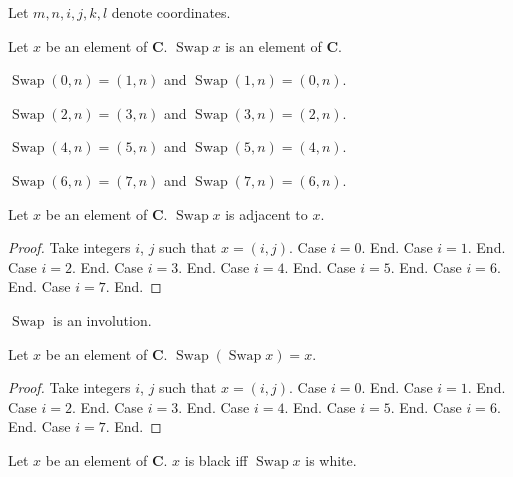 \documentclass[english]{article}
\newcommand{\Checkerboard}{\mathbf{C}}
\newcommand{\Swap}[1]{\operatorname{Swap}#1}
\begin{document}
\begin{forthel}
    Let $m, n, i, j, k, l$ denote coordinates.

    \begin{signature}
        Let $x$ be an element of $\Checkerboard$.
        $\Swap{x}$ is an element of $\Checkerboard$.
    \end{signature}

    \begin{axiom} $\Swap{(0, n)} = (1, n)$ and $\Swap{(1, n)} = (0, n)$. \end{axiom}

    \begin{axiom} $\Swap{(2, n)} = (3, n)$ and $\Swap{(3, n)} = (2, n)$. \end{axiom}

    \begin{axiom} $\Swap{(4, n)} = (5, n)$ and $\Swap{(5, n)} = (4, n)$. \end{axiom}

    \begin{axiom} $\Swap{(6, n)} = (7, n)$ and $\Swap{(7, n)} = (6, n)$. \end{axiom}

    \begin{lemma}
        Let $x$ be an element of $\Checkerboard$.
        $\Swap{x}$ is adjacent to $x$.
    \end{lemma}
    \begin{proof}
        Take integers $i$, $j$ such that $x = (i, j)$.
        Case $i = 0$. End.
        Case $i = 1$. End.
        Case $i = 2$. End.
        Case $i = 3$. End.
        Case $i = 4$. End.
        Case $i = 5$. End.
        Case $i = 6$. End.
        Case $i = 7$. End.
    \end{proof}
\end{forthel}

$\Swap{}$ is an involution.

\begin{forthel}
    \begin{lemma}
        Let $x$ be an element of $\Checkerboard$.
        $\Swap{(\Swap{x})} = x$.
    \end{lemma}
    \begin{proof}
        Take integers $i$, $j$ such that $x = (i, j)$.
        Case $i = 0$. End.
        Case $i = 1$. End.
        Case $i = 2$. End.
        Case $i = 3$. End.
        Case $i = 4$. End.
        Case $i = 5$. End.
        Case $i = 6$. End.
        Case $i = 7$. End.
    \end{proof}

    \begin{lemma}
        Let $x$ be an element of $\Checkerboard$.
        $x$ is black iff $\Swap{x}$ is white.
    \end{lemma}
\end{forthel}
\end{document}
